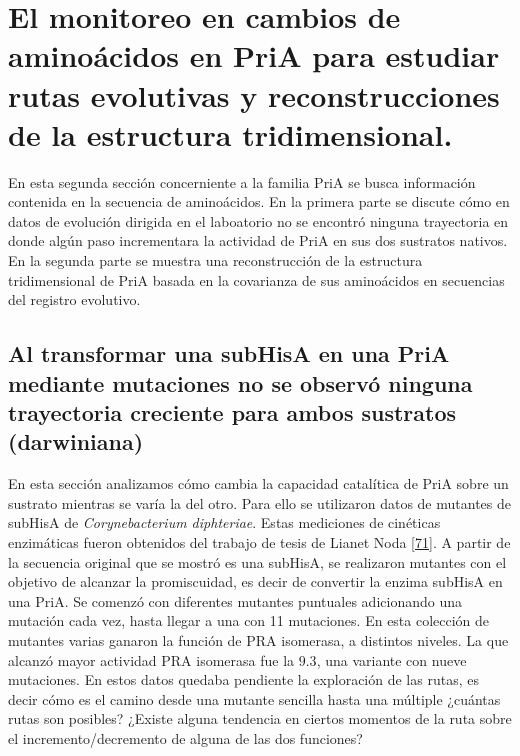 \documentclass[12pt,twoside]{reedthesis}
\begin{document}
{  \section{El monitoreo en cambios de aminoácidos en PriA para estudiar
  rutas evolutivas y reconstrucciones de la estructura
  tridimensional.}\label{el-monitoreo-en-cambios-de-aminoacidos-en-pria-para-estudiar-rutas-evolutivas-y-reconstrucciones-de-la-estructura-tridimensional.}
  
  En esta segunda sección concerniente a la familia PriA se busca
  información contenida en la secuencia de aminoácidos. En la primera
  parte se discute cómo en datos de evolución dirigida en el laboatorio no
  se encontró ninguna trayectoria en donde algún paso incrementara la
  actividad de PriA en sus dos sustratos nativos. En la segunda parte se
  muestra una reconstrucción de la estructura tridimensional de PriA
  basada en la covarianza de sus aminoácidos en secuencias del registro
  evolutivo.
  
  \subsection{Al transformar una subHisA en una PriA mediante mutaciones
  no se observó ninguna trayectoria creciente para ambos sustratos
  (darwiniana)}\label{al-transformar-una-subhisa-en-una-pria-mediante-mutaciones-no-se-observo-ninguna-trayectoria-creciente-para-ambos-sustratos-darwiniana}
  
  En esta sección analizamos cómo cambia la capacidad catalítica de PriA
  sobre un sustrato mientras se varía la del otro. Para ello se utilizaron
  datos de mutantes de subHisA de \emph{Corynebacterium diphteriae}. Estas
  mediciones de cinéticas enzimáticas fueron obtenidos del trabajo de
  tesis de Lianet Noda {[}\protect\hyperlink{ref-noda_tesis_2012}{71}{]}.
  A partir de la secuencia original que se mostró es una subHisA, se
  realizaron mutantes con el objetivo de alcanzar la promiscuidad, es
  decir de convertir la enzima subHisA en una PriA. Se comenzó con
  diferentes mutantes puntuales adicionando una mutación cada vez, hasta
  llegar a una con 11 mutaciones. En esta colección de mutantes varias
  ganaron la función de PRA isomerasa, a distintos niveles. La que alcanzó
  mayor actividad PRA isomerasa fue la \(9.3\), una variante con nueve
  mutaciones. En estos datos quedaba pendiente la exploración de las
  rutas, es decir cómo es el camino desde una mutante sencilla hasta una
  múltiple ¿cuántas rutas son posibles? ¿Existe alguna tendencia en
  ciertos momentos de la ruta sobre el incremento/decremento de alguna de
  las dos funciones?
  
}
\end{document}
